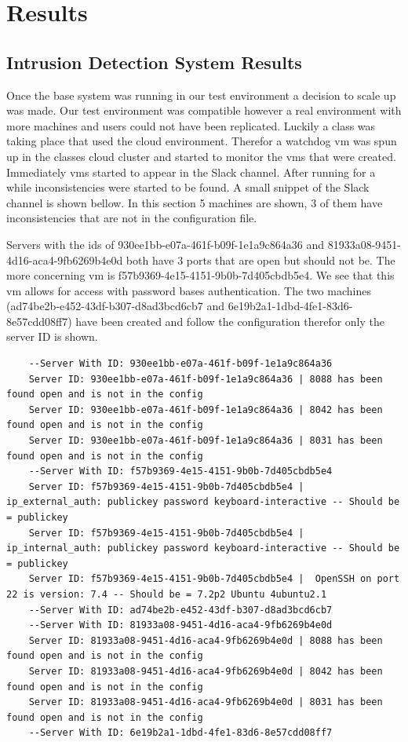 \documentclass[12pt]{article}
\begin{document}
\section{Results}

\subsection{Intrusion Detection System Results}
Once the base system was running in our test  environment a decision to scale up was made. Our test environment was compatible however a real environment with more machines and users could not have been replicated. Luckily a class was taking place that used the cloud environment. Therefor a watchdog vm was spun up in the classes cloud cluster and started to monitor the vms that were created. Immediately vms started to appear in the Slack channel. After running for a while inconsistencies were started to be found. A small snippet of the Slack channel is shown bellow. In this section 5 machines are shown, 3 of them have inconsistencies that are not in the configuration file.

Servers with the ids of 930ee1bb-e07a-461f-b09f-1e1a9c864a36 and 81933a08-9451-4d16-aca4-9fb6269b4e0d both have 3 ports that are open but should not be. The more concerning vm is f57b9369-4e15-4151-9b0b-7d405cbdb5e4. We see that this vm allows for access with password bases authentication. The two machines (ad74be2b-e452-43df-b307-d8ad3bcd6cb7 and 6e19b2a1-1dbd-4fe1-83d6-8e57cdd08ff7) have been created and follow the configuration therefor only the server ID is shown.

\begin{lstlisting}
    --Server With ID: 930ee1bb-e07a-461f-b09f-1e1a9c864a36
    Server ID: 930ee1bb-e07a-461f-b09f-1e1a9c864a36 | 8088 has been found open and is not in the config
    Server ID: 930ee1bb-e07a-461f-b09f-1e1a9c864a36 | 8042 has been found open and is not in the config
    Server ID: 930ee1bb-e07a-461f-b09f-1e1a9c864a36 | 8031 has been found open and is not in the config
    --Server With ID: f57b9369-4e15-4151-9b0b-7d405cbdb5e4
    Server ID: f57b9369-4e15-4151-9b0b-7d405cbdb5e4 |  ip_external_auth: publickey password keyboard-interactive -- Should be = publickey
    Server ID: f57b9369-4e15-4151-9b0b-7d405cbdb5e4 |  ip_internal_auth: publickey password keyboard-interactive -- Should be = publickey
    Server ID: f57b9369-4e15-4151-9b0b-7d405cbdb5e4 |  OpenSSH on port 22 is version: 7.4 -- Should be = 7.2p2 Ubuntu 4ubuntu2.1
    --Server With ID: ad74be2b-e452-43df-b307-d8ad3bcd6cb7
    --Server With ID: 81933a08-9451-4d16-aca4-9fb6269b4e0d
    Server ID: 81933a08-9451-4d16-aca4-9fb6269b4e0d | 8088 has been found open and is not in the config
    Server ID: 81933a08-9451-4d16-aca4-9fb6269b4e0d | 8042 has been found open and is not in the config
    Server ID: 81933a08-9451-4d16-aca4-9fb6269b4e0d | 8031 has been found open and is not in the config
    --Server With ID: 6e19b2a1-1dbd-4fe1-83d6-8e57cdd08ff7
\end{lstlisting}
\end{document}
